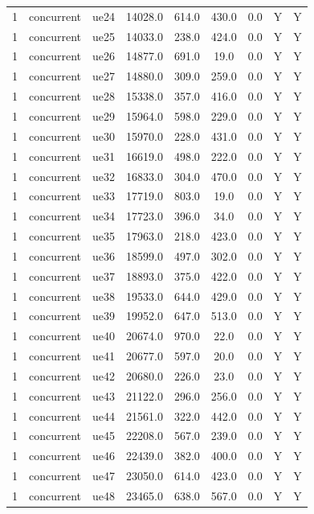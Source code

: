\begin{table}[ht]
\begin{tabular}{|c|c|c|c|c|c|c|c|c|}
1 & concurrent & ue24 & 14028.0 & 614.0 & 430.0 & 0.0 & Y & Y \\
1 & concurrent & ue25 & 14033.0 & 238.0 & 424.0 & 0.0 & Y & Y \\
1 & concurrent & ue26 & 14877.0 & 691.0 & 19.0 & 0.0 & Y & Y \\
1 & concurrent & ue27 & 14880.0 & 309.0 & 259.0 & 0.0 & Y & Y \\
1 & concurrent & ue28 & 15338.0 & 357.0 & 416.0 & 0.0 & Y & Y \\
1 & concurrent & ue29 & 15964.0 & 598.0 & 229.0 & 0.0 & Y & Y \\
1 & concurrent & ue30 & 15970.0 & 228.0 & 431.0 & 0.0 & Y & Y \\
1 & concurrent & ue31 & 16619.0 & 498.0 & 222.0 & 0.0 & Y & Y \\
1 & concurrent & ue32 & 16833.0 & 304.0 & 470.0 & 0.0 & Y & Y \\
1 & concurrent & ue33 & 17719.0 & 803.0 & 19.0 & 0.0 & Y & Y \\
1 & concurrent & ue34 & 17723.0 & 396.0 & 34.0 & 0.0 & Y & Y \\
1 & concurrent & ue35 & 17963.0 & 218.0 & 423.0 & 0.0 & Y & Y \\
1 & concurrent & ue36 & 18599.0 & 497.0 & 302.0 & 0.0 & Y & Y \\
1 & concurrent & ue37 & 18893.0 & 375.0 & 422.0 & 0.0 & Y & Y \\
1 & concurrent & ue38 & 19533.0 & 644.0 & 429.0 & 0.0 & Y & Y \\
1 & concurrent & ue39 & 19952.0 & 647.0 & 513.0 & 0.0 & Y & Y \\
1 & concurrent & ue40 & 20674.0 & 970.0 & 22.0 & 0.0 & Y & Y \\
1 & concurrent & ue41 & 20677.0 & 597.0 & 20.0 & 0.0 & Y & Y \\
1 & concurrent & ue42 & 20680.0 & 226.0 & 23.0 & 0.0 & Y & Y \\
1 & concurrent & ue43 & 21122.0 & 296.0 & 256.0 & 0.0 & Y & Y \\
1 & concurrent & ue44 & 21561.0 & 322.0 & 442.0 & 0.0 & Y & Y \\
1 & concurrent & ue45 & 22208.0 & 567.0 & 239.0 & 0.0 & Y & Y \\
1 & concurrent & ue46 & 22439.0 & 382.0 & 400.0 & 0.0 & Y & Y \\
1 & concurrent & ue47 & 23050.0 & 614.0 & 423.0 & 0.0 & Y & Y \\
1 & concurrent & ue48 & 23465.0 & 638.0 & 567.0 & 0.0 & Y & Y \\

\end{tabular}
\end{table}
